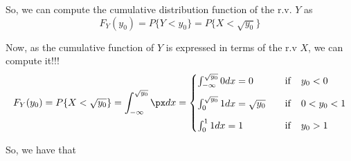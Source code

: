 So, we can compute the cumulative distribution function of the r.v. $Y$ as
$$ F_Y(y_0) =  P\{Y<y_0\} =  P\{X<\sqrt{y_0}\}$$

Now, as the cumulative function of $Y$ is expressed in terms of the r.v $X$, we can compute it!!!
\begin{eqnarray} 
F_Y(y_0) =  P\{X<\sqrt{y_0}\} = \int_{-\infty}^{\sqrt{y_0}} \px dx = 
\begin{cases}
\int_{-\infty}^{\sqrt{y_0}} 0 dx = 0 & \quad {\rm if} \quad y_0 <0 \\[2ex]
\int_0^{\sqrt{y_0}} 1 dx = \sqrt{y_0} & \quad {\rm if} \quad 0< y_0 <1 \\[2ex]
\int_0^{1} 1 dx = 1 & \quad {\rm if} \quad y_0 >1 \\
\end{cases}  \nonumber
\end{eqnarray}

So, we have that


